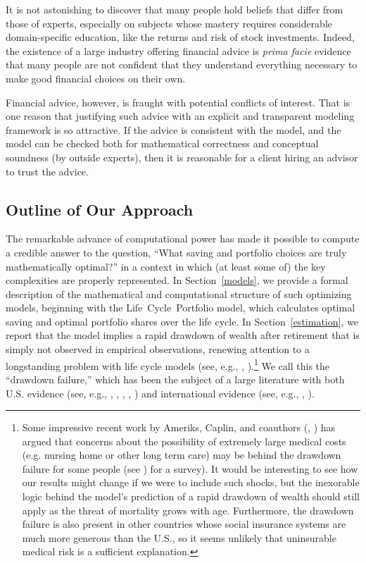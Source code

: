 \documentclass[12pt,letterpaper, fleqn]{article}
\begin{document}
It is not astonishing to discover that many people hold beliefs that differ from those of experts, especially on subjects whose mastery requires considerable domain-specific education, like the returns and risk of stock investments.
Indeed, the existence of a large industry offering financial advice is \textit{prima facie} evidence that many people are not confident that they understand everything necessary to make good financial choices on their own.

Financial advice, however, is fraught with potential conflicts of interest.
That is one reason that justifying such advice with an explicit and transparent modeling framework is so attractive.
If the advice is consistent with the model, and the model can be checked both for mathematical correctness and conceptual soundness (by outside experts), then it is reasonable for a client hiring an advisor to trust the advice.

\subsection{Outline of Our Approach}

The remarkable advance of computational power has made it possible to compute a credible answer to the question, ``What saving and portfolio choices are truly mathematically optimal?'' in a context in which (at least some of) the key complexities are properly represented.
In Section~\ref{models}, we provide a formal description of the mathematical and computational structure of such optimizing models, beginning with the Life~Cycle~Portfolio model, which calculates optimal saving and optimal portfolio shares over the life cycle.
In Section~\ref{estimation}, we report that the model implies a rapid drawdown of wealth after retirement that is simply not observed in empirical observations, renewing attention to a longstanding problem with life cycle models (see, e.g., \cite{hurd1987savings}, \cite{HEIMER_2019}).\footnote{Some impressive recent work by Ameriks, Caplin, and coauthors (\cite{ameriks2011joy}, \cite{Ameriks2020jpe}) has argued that concerns about the possibility of extremely large medical costs (e.g. nursing home or other long term care) may be behind the drawdown failure for some people (see \cite{DeNardi2016d}) for a survey).
It would be interesting to see how our results might change if we were to include such shocks, but the inexorable logic behind the model's prediction of a rapid drawdown of wealth should still apply as the threat of mortality grows with age.
Furthermore, the drawdown failure is also present in other countries whose social insurance systems are much more generous than the U.S., so it seems unlikely that uninsurable medical risk is a sufficient explanation.}
We call this the ``drawdown failure,'' which has been the subject of a large literature with both U.S. evidence (see, e.g., \cite{Hurd_1989}, \cite{DeNardi2016d}, \cite{Kopecky_2014}, \cite{Mortenson_2019}, \cite{Poterba_2018}) and international evidence (see, e.g., \cite{Christensen_2022}, \cite{Ventura_2020}).
\end{document}
